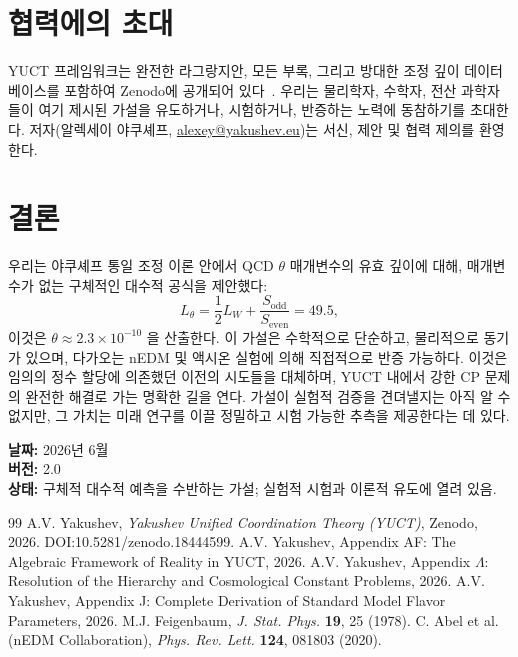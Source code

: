 \documentclass[11pt,a4paper]{article}
\begin{document}
	\section{협력에의 초대}
	\label{sec:invite}
	
	YUCT 프레임워크는 완전한 라그랑지안, 모든 부록, 그리고 방대한 조정 깊이 데이터베이스를 포함하여 Zenodo에 공개되어 있다~\cite{Y1,Y2}. 우리는 물리학자, 수학자, 전산 과학자들이 여기 제시된 가설을 유도하거나, 시험하거나, 반증하는 노력에 동참하기를 초대한다. 저자(알렉세이 야쿠셰프, \href{mailto:alexey@yakushev.eu}{alexey@yakushev.eu})는 서신, 제안 및 협력 제의를 환영한다.
	
	\section{결론}
	\label{sec:conclusion}
	
	우리는 야쿠셰프 통일 조정 이론 안에서 QCD \(\theta\) 매개변수의 유효 깊이에 대해, 매개변수가 없는 구체적인 대수적 공식을 제안했다:
	\[
	L_\theta = \frac{1}{2}L_W + \frac{S_{\mathrm{odd}}}{S_{\mathrm{even}}} = 49.5,
	\]
	이것은 \(\theta \approx 2.3 \times 10^{-10}\) 을 산출한다. 이 가설은 수학적으로 단순하고, 물리적으로 동기가 있으며, 다가오는 nEDM 및 액시온 실험에 의해 직접적으로 반증 가능하다. 이것은 임의의 정수 할당에 의존했던 이전의 시도들을 대체하며, YUCT 내에서 강한 CP 문제의 완전한 해결로 가는 명확한 길을 연다. 가설이 실험적 검증을 견뎌낼지는 아직 알 수 없지만, 그 가치는 미래 연구를 이끌 정밀하고 시험 가능한 추측을 제공한다는 데 있다.
	
	\vspace{1cm}
	\noindent\textbf{날짜:} 2026년 6월\\
	\textbf{버전:} 2.0\\
	\textbf{상태:} 구체적 대수적 예측을 수반하는 가설; 실험적 시험과 이론적 유도에 열려 있음.
	
	\newpage
	\begin{thebibliography}{99}
		 A.V. Yakushev, \textit{Yakushev Unified Coordination Theory (YUCT)}, Zenodo, 2026. DOI:10.5281/zenodo.18444599.
		 A.V. Yakushev, Appendix AF: The Algebraic Framework of Reality in YUCT, 2026.
		 A.V. Yakushev, Appendix \(\Lambda\): Resolution of the Hierarchy and Cosmological Constant Problems, 2026.
		 A.V. Yakushev, Appendix J: Complete Derivation of Standard Model Flavor Parameters, 2026.
		 M.J. Feigenbaum, \textit{J. Stat. Phys.} \textbf{19}, 25 (1978).
		 C. Abel et al. (nEDM Collaboration), \textit{Phys. Rev. Lett.} \textbf{124}, 081803 (2020).
	\end{thebibliography}
	
\end{document}
